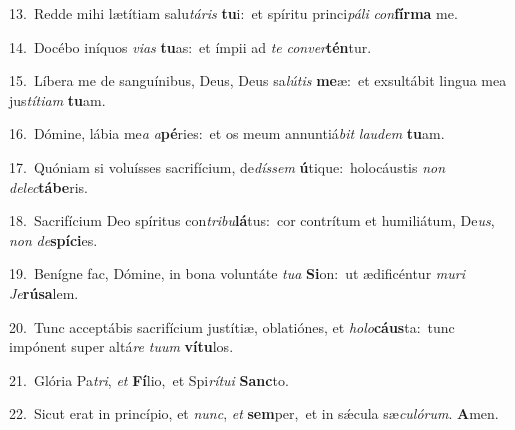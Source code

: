{\numbfont\textcolor{\numbcolor}{13.}}~Redde mihi lætítiam salu\-\textit{tá}\-\textit{ris} \textbf{tu}\-i:~\star et spíritu princi\-\textit{pá}\-\textit{li} \textit{con}\-\textbf{fír}\textbf{ma} me.\par
{\numbfont\textcolor{\numbcolor}{14.}}~Docébo iníquos \textit{vi}\-\textit{as} \textbf{tu}\-as:~\star et ímpii ad \textit{te} \textit{con}\-\textit{ver}\textbf{tén}tur.\par
{\numbfont\textcolor{\numbcolor}{15.}}~Líbera me de sanguínibus, Deus, Deus sa\-\textit{lú}\-\textit{tis} \textbf{me}\-æ:~\star et exsultábit lingua mea jus\-\textit{tí}\-\textit{ti}\textit{am} \textbf{tu}\-am.\par
{\numbfont\textcolor{\numbcolor}{16.}}~Dómine, lábia me\textit{a} \textit{a}\-\textbf{pé}ries:~\star et os meum annuntiá\textit{bit} \textit{lau}\-\textit{dem} \textbf{tu}\-am.\par
{\numbfont\textcolor{\numbcolor}{17.}}~Quóniam si voluísses sacrifícium, de\-\textit{dís}\-\textit{sem} \textbf{ú}\-tique:~\star holocáustis \textit{non} \textit{de}\-\textit{lec}\textbf{tá}\textbf{be}ris.\par
{\numbfont\textcolor{\numbcolor}{18.}}~Sacrifícium Deo spíritus con\-\textit{tri}\-\textit{bu}\textbf{lá}tus:~\star cor contrítum et humiliátum, De\-\textit{us}\-, \textit{non} \textit{de}\-\textbf{spí}\textbf{ci}es.\par
{\numbfont\textcolor{\numbcolor}{19.}}~Benígne fac, Dómine, in bona voluntáte \textit{tu}\-\textit{a} \textbf{Si}\-on:~\star ut ædificéntur \textit{mu}\-\textit{ri} \textit{Je}\-\textbf{rú}\textbf{sa}lem.\par
{\numbfont\textcolor{\numbcolor}{20.}}~Tunc acceptábis sacrifícium justítiæ, oblatiónes, et \textit{ho}\-\textit{lo}\textbf{cáus}ta:~\star tunc impónent super altá\textit{re} \textit{tu}\-\textit{um} \textbf{ví}\-\textbf{tu}los.\par
{\numbfont\textcolor{\numbcolor}{21.}}~Glória Pa\-\textit{tri}\-, \textit{et} \textbf{Fí}\-lio,~\star et Spi\-\textit{rí}\-\textit{tu}\textit{i} \textbf{Sanc}\-to.\par
{\numbfont\textcolor{\numbcolor}{22.}}~Sicut erat in princípio, et \textit{nunc}\-, \textit{et} \textbf{sem}\-per,~\star et in sǽcula sæ\-\textit{cu}\-\textit{ló}\textit{rum}. \textbf{A}\-men.\par
